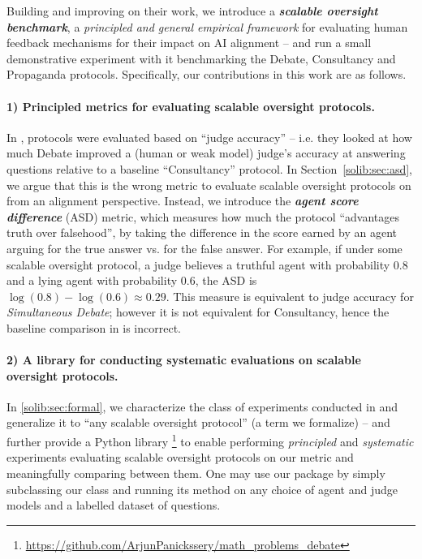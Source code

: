 Building and improving on their work, we introduce a \textbf{\emph{scalable oversight benchmark}}, a \emph{principled and general empirical framework} for evaluating human feedback mechanisms for their impact on AI alignment -- and run a small demonstrative experiment with it benchmarking the Debate, Consultancy and Propaganda protocols. Specifically, our contributions in this work are as follows.

\paragraph{1) Principled metrics for evaluating scalable oversight protocols.} In \previouswork{}, protocols were evaluated based on ``judge accuracy'' -- i.e. they looked at how much Debate improved a (human or weak model) judge's accuracy at answering questions relative to a baseline ``Consultancy'' protocol. In Section~\ref{solib:sec:asd}, we argue that this is the wrong metric to evaluate scalable oversight protocols on from an alignment perspective. Instead, we introduce the \emph{\textbf{agent score difference}} (ASD) metric, which measures how much the protocol ``advantages truth over falsehood'', by taking the difference in the score earned by an agent arguing for the true answer vs. for the false answer. For example, if under some scalable oversight protocol, a judge believes a truthful agent with probability \(0.8\) and a lying agent with probability \(0.6\), the ASD is \(\log(0.8)-\log(0.6)\approx 0.29\). This measure is equivalent to judge accuracy for \emph{Simultaneous Debate}; however it is not equivalent for Consultancy, hence the baseline comparison in \previouswork{} is incorrect.


\paragraph{2) A library for conducting systematic evaluations on scalable oversight protocols.} In \cref{solib:sec:formal}, we characterize the class of experiments conducted in \previouswork{} and generalize it to ``any scalable oversight protocol'' (a term we formalize) -- and further provide a Python library \solib{}\footnote{\url{https://github.com/ArjunPanickssery/math_problems_debate}} to enable performing \emph{principled} and \emph{systematic} experiments evaluating scalable oversight protocols on our metric and meaningfully comparing between them. One may use our package by simply subclassing our \Protocol{} class and running its \Protocolexp{} method on any choice of agent and judge models and a labelled dataset of questions.%

